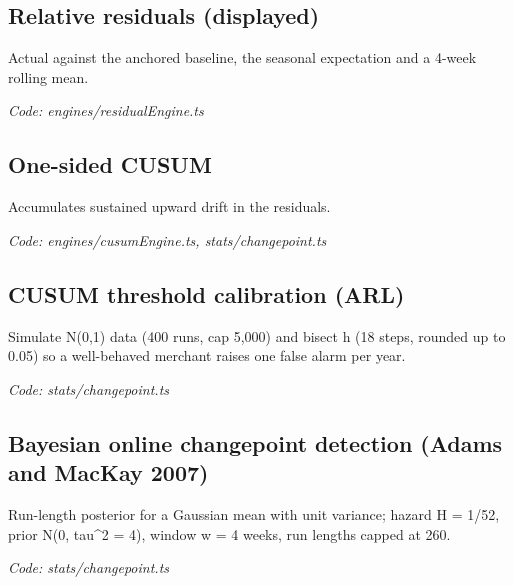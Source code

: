 \documentclass[11pt,a4paper]{article}
\newcommand{\where}[1]{\par{\small\itshape\color{mute}Code: #1}\par}
\begin{document}
\subsection*{Relative residuals (displayed)}
\par\smallskip\noindent{}\par\smallskip
Actual against the anchored baseline, the seasonal expectation and a 4-week rolling mean.
\where{engines/residualEngine.ts}

\subsection*{One-sided CUSUM}
\par\smallskip\noindent{}\par\smallskip
Accumulates sustained upward drift in the residuals.
\where{engines/cusumEngine.ts, stats/changepoint.ts}

\subsection*{CUSUM threshold calibration (ARL)}
\par\smallskip\noindent{}\par\smallskip
Simulate N(0,1) data (400 runs, cap 5,000) and bisect h (18 steps, rounded up to 0.05) so a well-behaved merchant raises one false alarm per year.
\where{stats/changepoint.ts}

\subsection*{Bayesian online changepoint detection (Adams and MacKay 2007)}
\par\smallskip\noindent{}\par\smallskip
\par\smallskip\noindent{}\par\smallskip
Run-length posterior for a Gaussian mean with unit variance; hazard H = 1/52, prior N(0, tau\textasciicircum{}2 = 4), window w = 4 weeks, run lengths capped at 260.
\where{stats/changepoint.ts}
\end{document}
